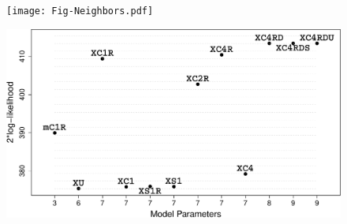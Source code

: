 \documentclass[11pt, titlepage]{article}\usepackage[]{graphicx}\usepackage[]{color}
\begin{document}
\begin{spacing}{1.9}
\begin{flushleft}


\begin{figure}[H]
  \begin{center}
  \texttt{[image: Fig-Neighbors.pdf]}
  \end{center}
  \caption{ \label{Fig-Neighbors}}     
\end{figure}




\begin{figure}[H]
  \begin{center}
  \includegraphics[width=\linewidth]{Fig-ModelsM2LL.pdf}
  \end{center}
  \caption{ \label{Fig-ModelsM2LL}}     
\end{figure}




\end{flushleft}
\end{spacing}
\end{document}
